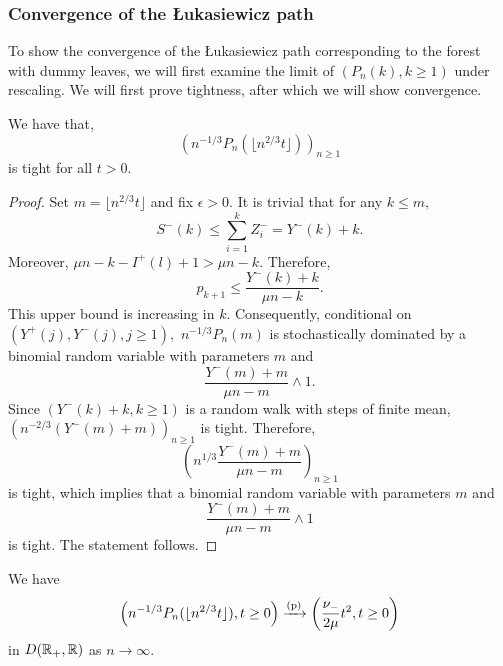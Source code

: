 \subsubsection{Convergence of the \L ukasiewicz path}
To show the convergence of the \L ukasiewicz path corresponding to the forest with dummy leaves, we will first examine the limit of $(P_n(k), k\geq 1)$ under rescaling. We will first prove tightness, after which we will show convergence.


\begin{lemma}\label{lemma.tightnesssurplusedges}
 We have that, $$\left(n^{-1/3}P_n\left(\lfloor  n^{2/3}t\rfloor \right) \right)_{n\geq 1}$$ 
 is tight for all $t>0$.
 \end{lemma}
 \begin{proof}
Set $m=\lfloor  n^{2/3}t\rfloor$ and fix $\epsilon>0$. It is trivial that for any $k\leq m$, $$S^{-}(k)\leq \sum_{i=1}^k Z^-_i=Y^-(k)+k.$$ Moreover, $\mu n - k -I^{+}(l)+1>\mu n-k$.  Therefore, $$p_{k+1}\leq \frac{Y^-(k)+k}{\mu n - k}.$$
This upper bound is increasing in $k$. Consequently, conditional on $(Y^+(j),Y^-(j),j\geq 1),$ $n^{-1/3}P_n(m)$ is stochastically dominated by a binomial random variable with parameters  $m$ and $$\frac{Y^-(m)+m}{\mu n - m}\wedge 1.$$
Since $(Y^-(k)+k,k\geq 1)$ is a random walk with steps of finite mean, $\left(n^{-2/3}(Y^-(m)+m)\right)_{n\geq 1}$ is tight. Therefore,
$$\left(n^{1/3} \frac{Y^-(m)+m}{\mu n - m}\right)_{n\geq 1}$$ is tight, which implies that a binomial random variable with parameters  $m$ and $$\frac{Y^-(m)+m}{\mu n - m}\wedge 1$$
is tight. The statement follows.
\end{proof}
\begin{lemma}\label{lemma.convergenceQandP}
We have  
$$\left(n^{-1/3}P_n(\lfloor n^{2/3}t\rfloor), t \geq 0 \right)\xrightarrow[]{\mathrm{(p)}} \left(\frac{\nu_-}{2\mu} t^2, t\geq 0 \right)$$
in $D({\mathbb R}_+,{\mathbb R})$ as $n\to \infty$.

\end{lemma}

